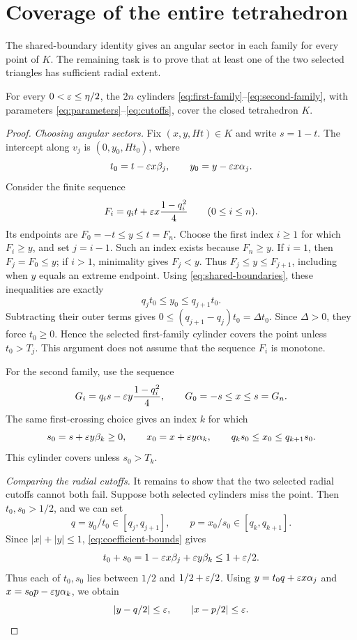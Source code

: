 \section{Coverage of the entire tetrahedron}\label{sec:coverage}

The shared-boundary identity gives an angular sector in each family for
every point of $K$. The remaining task is to prove that at least one of the
two selected triangles has sufficient radial extent.

\begin{proposition}\label{prop:coverage}
For every $0<\varepsilon\le\eta/2$, the $2n$ cylinders
\eqref{eq:first-family}--\eqref{eq:second-family}, with parameters
\eqref{eq:parameters}--\eqref{eq:cutoffs}, cover the closed tetrahedron $K$.
\end{proposition}
\begin{proof}
\emph{Choosing angular sectors.} Fix $(x,y,Ht)\in K$ and write $s=1-t$.
The intercept along $v_j$ is $(0,y_0,Ht_0)$, where
\begin{equation}\label{eq:lower-intercept}
 t_0=t-\varepsilon x\beta_j,\qquad y_0=y-\varepsilon x\alpha_j.
\end{equation}
Consider the finite sequence
\[
 F_i=q_it+\varepsilon x\frac{1-q_i^2}{4}\qquad(0\le i\le n).
\]
Its endpoints are $F_0=-t\le y\le t=F_n$.
Choose the first index $i\ge1$ for which $F_i\ge y$, and set $j=i-1$.
Such an index exists because $F_n\ge y$. If $i=1$, then $F_j=F_0\le y$;
if $i>1$, minimality gives $F_j<y$. Thus
$F_j\le y\le F_{j+1}$, including when $y$ equals an extreme endpoint.
Using \eqref{eq:shared-boundaries}, these inequalities are exactly
\begin{equation}\label{eq:lower-sector}
 q_jt_0\le y_0\le q_{j+1}t_0.
\end{equation}
Subtracting their outer terms gives $0\le(q_{j+1}-q_j)t_0=\Delta t_0$.
Since $\Delta>0$, they force $t_0\ge0$.
Hence the selected first-family cylinder covers the point unless $t_0>T_j$.
This argument does not assume that the sequence $F_i$ is monotone.

For the second family, use the sequence
\[
 G_i=q_is-\varepsilon y\frac{1-q_i^2}{4},\qquad G_0=-s\le x\le s=G_n.
\]
The same first-crossing choice gives an index $k$ for which
\begin{equation}\label{eq:upper-intercept}
 s_0=s+\varepsilon y\beta_k\ge0,\qquad x_0=x+\varepsilon y\alpha_k,\qquad
 q_ks_0\le x_0\le q_{k+1}s_0.
\end{equation}
This cylinder covers unless $s_0>T_k$.

\emph{Comparing the radial cutoffs.} It remains to show that the two selected radial cutoffs cannot both fail.
Suppose both selected cylinders miss the point.
Then $t_0,s_0>1/2$, and we can set
\[
 q=y_0/t_0\in[q_j,q_{j+1}],\qquad
 p=x_0/s_0\in[q_k,q_{k+1}].
\]
Since $|x|+|y|\le1$, \eqref{eq:coefficient-bounds} gives
\[
 t_0+s_0=1-\varepsilon x\beta_j+\varepsilon y\beta_k\le1+\varepsilon/2.
\]
Thus each of $t_0,s_0$ lies between $1/2$ and $1/2+\varepsilon/2$.
Using $y=t_0q+\varepsilon x\alpha_j$ and $x=s_0p-\varepsilon y\alpha_k$, we obtain
\begin{equation}\label{eq:rough-angles}
 |y-q/2|\le\varepsilon,\qquad |x-p/2|\le\varepsilon.
\end{equation}


\end{proof}
